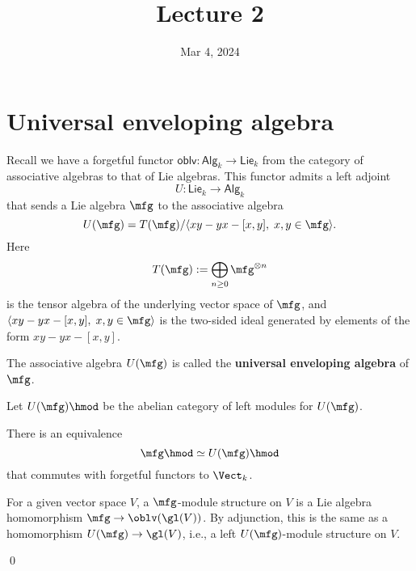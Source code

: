 





\title{Lecture 2}

\date{Mar 4, 2024}

\maketitle


\section{Universal enveloping algebra}

\begin{constr}
	Recall we have a forgetful functor $\mathsf{oblv}:\mathsf{Alg}_k \to \mathsf{Lie}_k$ from the category of associative algebras to that of Lie algebras. This functor admits a left adjoint
	\[
		U: \mathsf{Lie}_k \to \mathsf{Alg}_k
	\]
	that sends a Lie algebra $\mfg$ to the associative algebra
	\[
		U(\mfg) = T(\mfg)/\langle xy-yx-[x,y],\; x,y\in \mfg \rangle.
	\]
	Here 
	\[
		T(\mfg) := \bigoplus_{n\ge 0} \mfg^{\otimes n}
	\]
	is the tensor algebra of the underlying vector space of $\mfg$, and $\langle xy-yx-[x,y],\; x,y\in \mfg \rangle$ is the two-sided ideal generated by elements of the form $xy-yx-[x,y]$.

	The associative algebra $U(\mfg)$ is called the \textbf{universal enveloping algebra} of $\mfg$.
\end{constr}

Let $U(\mfg) \hmod$ be the abelian category of left modules for $U(\mfg)$.

\begin{lem}
	There is an equivalence
	\[
		\mfg\hmod \simeq U(\mfg) \hmod
	\]
	that commutes with forgetful functors to $\Vect_k$.
\end{lem}

\proof
	For a given vector space $V$, a $\mfg$-module structure on $V$ is a Lie algebra homomorphism $\mfg \to \oblv(\gl(V))$. By adjunction, this is the same as a homomorphism $U(\mfg) \to \gl(V)$, i.e., a left $U(\mfg)$-module structure on $V$.

\qed

